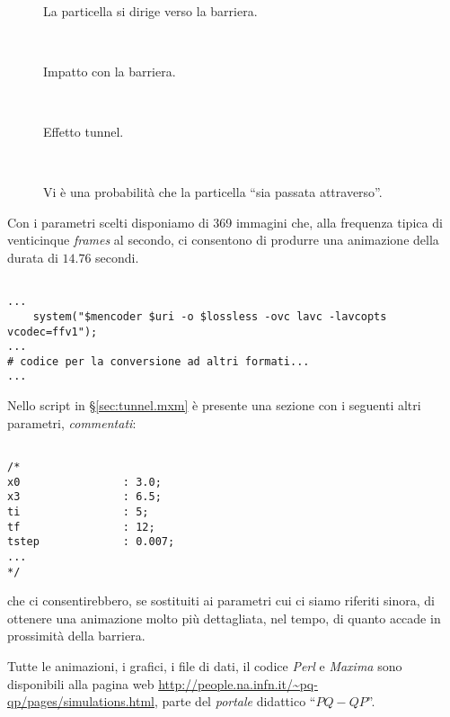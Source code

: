\begin{figure}\begin{center}
   \\
  \caption{La particella si dirige verso la barriera.}
  \label{fig:tunnel_first}
\end{center}\end{figure}
\begin{figure}\begin{center}
   \\
  \caption{Impatto con la barriera.}\label{fig:impact}
\end{center}\end{figure}
\begin{figure}\begin{center}
   \\
  \caption{Effetto tunnel.}\label{fig:tunnel_effect}
\end{center}\end{figure}
\begin{figure}\begin{center}
   \\
  \caption{Vi è una probabilità che la particella ``sia passata attraverso''.}
  \label{fig:tunnel_last}
\end{center}\end{figure}              

Con i parametri scelti disponiamo di 369 immagini che, alla frequenza
tipica di venticinque \textit{frames} al secondo, ci consentono di
produrre una animazione della durata di $14.76$ secondi.
\begin{lstlisting}

...
    system("$mencoder $uri -o $lossless -ovc lavc -lavcopts vcodec=ffv1");
...
# codice per la conversione ad altri formati...
...
\end{lstlisting}

Nello script in \S\ref{sec:tunnel.mxm} è presente una sezione con
i seguenti altri parametri, \emph{commentati}:
\begin{lstlisting}

/*
x0                : 3.0;
x3                : 6.5;
ti                : 5;
tf                : 12;
tstep             : 0.007;
...
*/

\end{lstlisting}
che ci consentirebbero, se sostituiti ai parametri cui ci siamo riferiti
sinora, di ottenere una animazione molto più dettagliata, nel tempo,
di quanto accade in prossimità della barriera.

Tutte le animazioni, i grafici, i file di dati, il codice 
\emph{Perl} e \emph{Maxima} sono disponibili alla
pagina web \url{http://people.na.infn.it/~pq-qp/pages/simulations.html},
parte del \emph{portale} didattico ``$PQ-QP$''\cite{PQ-QP}.

